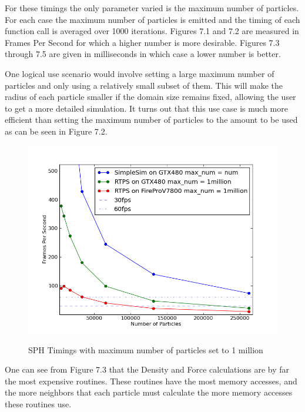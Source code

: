 For these timings the only parameter varied is the maximum number of particles.
For each case the maximum number of particles is emitted and the timing of each
function call is averaged over 1000 iterations. Figures 7.1 and 7.2 are
measured in Frames Per Second for which a higher number is more desirable.
Figures 7.3 through 7.5 are given in milliseconds in which case a lower number
is better.

\pagebreak

One logical use scenario would involve setting a large maximum number of
particles and only using a relatively small subset of them. This will make the
radius of each particle smaller if the domain size remains fixed, allowing the
user to get a more detailed simulation. It turns out that this use case is much
more efficient than setting the maximum number of particles to the amount to be
used as can be seen in Figure 7.2. 

\begin{figure}[!htc]
 		\centering
		\includegraphics[scale=0.5]{figures/maxnum_eq_1mill_fps.png}
		\label{fig:logic}
        \caption{ SPH Timings with maximum number of particles set to 1 million }
\end{figure}

\pagebreak

One can see from Figure 7.3 that the Density and Force calculations are by far
the most expensive routines. These routines have the most memory accesses, and
the more neighbors that each particle must calculate the more memory accesses
these routines use. 


